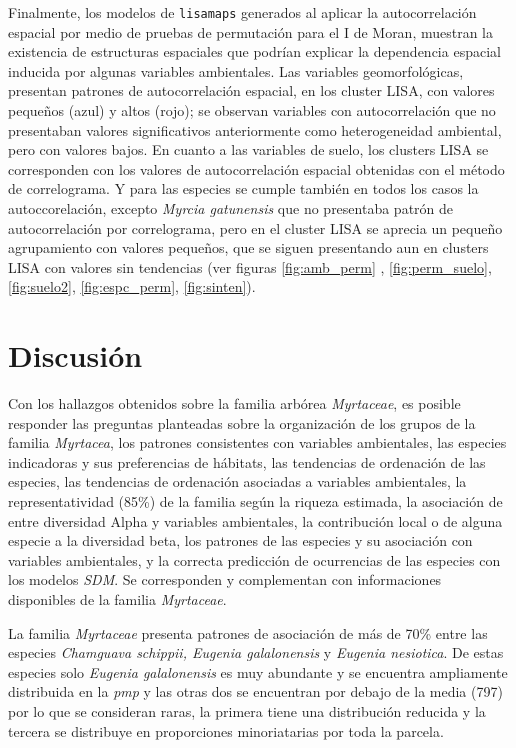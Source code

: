 \documentclass[11pt,]{article}
\begin{document}
Finalmente, los modelos de \texttt{lisamaps} generados al aplicar la
autocorrelación espacial por medio de pruebas de permutación para el I
de Moran, muestran la existencia de estructuras espaciales que podrían
explicar la dependencia espacial inducida por algunas variables
ambientales. Las variables geomorfológicas, presentan patrones de
autocorrelación espacial, en los cluster LISA, con valores pequeños
(azul) y altos (rojo); se observan variables con autocorrelación que no
presentaban valores significativos anteriormente como heterogeneidad
ambiental, pero con valores bajos. En cuanto a las variables de suelo,
los clusters LISA se corresponden con los valores de autocorrelación
espacial obtenidas con el método de correlograma. Y para las especies se
cumple también en todos los casos la autoccorelación, excepto
\emph{Myrcia gatunensis} que no presentaba patrón de autocorrelación por
correlograma, pero en el cluster LISA se aprecia un pequeño agrupamiento
con valores pequeños, que se siguen presentando aun en clusters LISA con
valores sin tendencias (ver figuras \ref{fig:amb_perm} ,
\ref{fig:perm_suelo}, \ref{fig:suelo2}, \ref{fig:espc_perm},
\ref{fig:sinten}).

\section{Discusión}\label{discusiuxf3n}

Con los hallazgos obtenidos sobre la familia arbórea \emph{Myrtaceae},
es posible responder las preguntas planteadas sobre la organización de
los grupos de la familia \emph{Myrtacea}, los patrones consistentes con
variables ambientales, las especies indicadoras y sus preferencias de
hábitats, las tendencias de ordenación de las especies, las tendencias
de ordenación asociadas a variables ambientales, la representatividad
(85\%) de la familia según la riqueza estimada, la asociación de entre
diversidad Alpha y variables ambientales, la contribución local o de
alguna especie a la diversidad beta, los patrones de las especies y su
asociación con variables ambientales, y la correcta predicción de
ocurrencias de las especies con los modelos \emph{SDM}. Se corresponden
y complementan con informaciones disponibles de la familia
\emph{Myrtaceae}.

La familia \emph{Myrtaceae} presenta patrones de asociación de más de
70\% entre las especies \emph{Chamguava schippii, Eugenia galalonensis}
y \emph{Eugenia nesiotica}. De estas especies solo \emph{Eugenia
galalonensis} es muy abundante y se encuentra ampliamente distribuida en
la \emph{pmp} y las otras dos se encuentran por debajo de la media (797)
por lo que se consideran raras, la primera tiene una distribución
reducida y la tercera se distribuye en proporciones minoriatarias por
toda la parcela.
\end{document}
